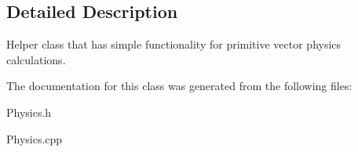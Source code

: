 \subsection{Detailed Description}
Helper class that has simple functionality for primitive vector physics calculations. 

The documentation for this class was generated from the following files\+:\begin{DoxyCompactItemize}
\item 
Physics.\+h\item 
Physics.\+cpp\end{DoxyCompactItemize}
